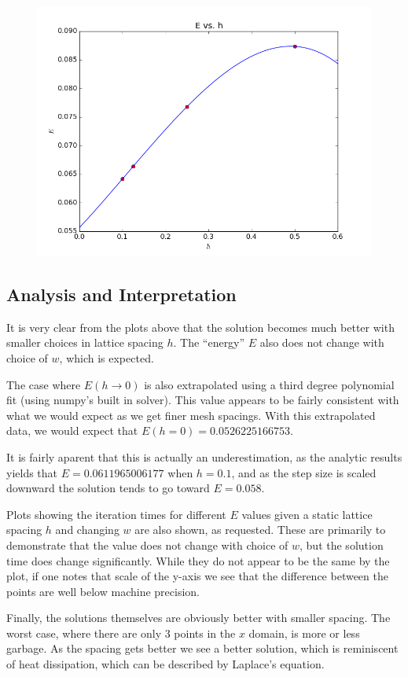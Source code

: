 \documentclass[10pt,letter]{article}
\begin{document}
\begin{figure}[H]
  \centering
    \includegraphics[width=.6\textwidth]{homework7_problem1_plot25}
\end{figure}

\subsection{Analysis and Interpretation}

It is very clear from the plots above that the solution becomes much better with smaller choices in lattice spacing $h$. The ``energy'' $E$ also does not change with choice of $w$, which is expected.

The case where $E(h\rightarrow0)$ is also extrapolated using a third degree polynomial fit (using numpy's built in solver). This value appears to be fairly consistent with what we would expect as we get finer mesh spacings. With this extrapolated data, we would expect that $E(h=0) = 0.0526225166753.$

It is fairly aparent that this is actually an underestimation, as the analytic results yields that $E=0.0611965006177$ when $h=0.1$, and as the step size is scaled downward the solution tends to go toward $E=0.058$.

Plots showing the iteration times for different $E$ values given a static lattice spacing $h$ and changing $w$ are also shown, as requested. These are primarily to demonstrate that the value does not change with choice of $w$, but the solution time does change significantly. While they do not appear to be the same by the plot, if one notes that scale of the y-axis we see that the difference between the points are well below machine precision.

Finally, the solutions themselves are obviously better with smaller spacing. The worst case, where there are only 3 points in the $x$ domain, is more or less garbage. As the spacing gets better we see a better solution, which is reminiscent of heat dissipation, which can be described by Laplace's equation.
\end{document}
